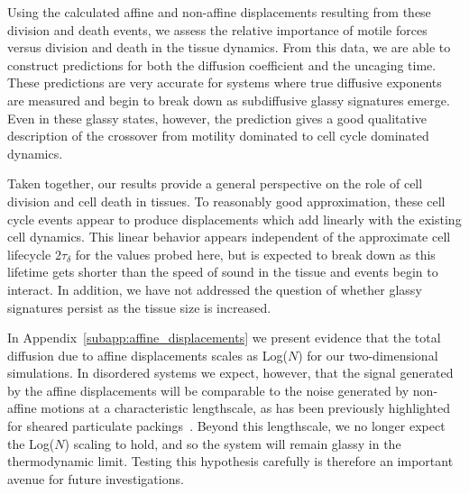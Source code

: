 \documentclass[
reprint
,aps
,amssymb
,amsmath
,superscriptaddress
]{revtex4-1}
\newcommand{\mdc}[1]{{\color{blue}#1}}
\begin{document}
Using the calculated affine and non-affine displacements resulting from these division and death events, we assess the relative importance of motile forces versus division and death in the tissue dynamics. From this data, we are able to construct predictions for both the diffusion coefficient and the uncaging time. These predictions are very accurate for systems where true diffusive exponents are measured and begin to break down as subdiffusive glassy signatures emerge. Even in these glassy states, however, the prediction gives a good qualitative description of the crossover from motility dominated to cell cycle dominated dynamics. 

Taken together, our results provide a general perspective on the role of cell division and cell death in tissues. To reasonably good approximation, these cell cycle events appear to produce displacements which add linearly with the existing cell dynamics. This linear behavior appears independent of the approximate cell lifecycle $2 \tau_\delta$ for the values probed here, but is expected to break down as this lifetime gets shorter than the speed of sound in the tissue and events begin to interact. In addition, we have not addressed the question of whether glassy signatures persist as the tissue size is increased.

\mdc{In Appendix~\ref{subapp:affine_displacements} we present evidence that the total diffusion due to affine displacements scales as Log($N$) for our two-dimensional simulations. In disordered systems we expect, however, that the signal generated by the affine displacements will be comparable to the noise generated by non-affine motions at a characteristic lengthscale, as has been previously highlighted for sheared particulate packings~\cite{Lemaitre2009}.  Beyond this lengthscale, we no longer expect the Log($N$) scaling to hold, and so the system will remain glassy in the thermodynamic limit. Testing this hypothesis carefully is therefore an important avenue for future investigations. }
\end{document}
